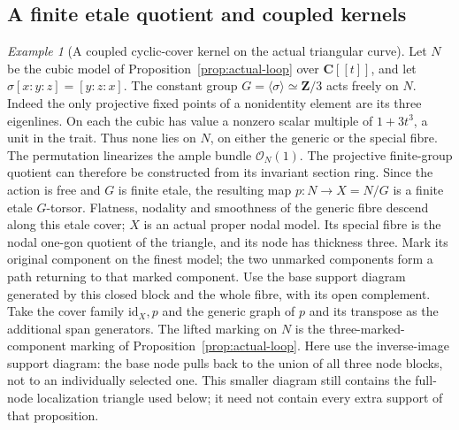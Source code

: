 \documentclass[11pt]{article}
\theoremstyle{definition}
\theoremstyle{remark}
\newtheorem{example}[theorem]{Example}
\begin{document}
\subsection{A finite etale quotient and coupled kernels}
\begin{example}[A coupled cyclic-cover kernel on the actual triangular curve]
\label{ex:etale-cyclic-span}
Let $N$ be the cubic model of Proposition~\ref{prop:actual-loop}
over $\mathbf C[[t]]$, and let $\sigma[x:y:z]=[y:z:x]$.
The constant group $G=\langle\sigma\rangle\simeq\mathbf Z/3$
acts freely on $N$. Indeed the only projective fixed points of a
nonidentity element are its three eigenlines. On each the cubic
has value a nonzero scalar multiple of $1+3t^3$, a unit in the trait.
Thus none lies on $N$, on either the generic or the special fibre.
The permutation linearizes the ample bundle $\mathcal O_N(1)$.
The projective finite-group quotient can therefore be constructed
from its invariant section ring. Since the action is free and $G$
is finite etale, the resulting map $p:N\to X=N/G$ is a finite
etale $G$-torsor. Flatness, nodality and
smoothness of the generic fibre descend along this etale cover;
$X$ is an actual proper nodal model. Its special fibre is the nodal
one-gon quotient of the triangle, and its node has thickness three.
Mark its original component on the finest model; the two unmarked
components form a path returning to that marked component. Use the
base support diagram generated by this closed block and the whole
fibre, with its open complement. Take the cover family
$\mathrm{id}_X,p$ and the generic graph of $p$ and its transpose
as the additional span generators.
The lifted marking on $N$ is the three-marked-component marking
of Proposition~\ref{prop:actual-loop}. Here use the inverse-image
support diagram: the base node pulls back to the union of all three
node blocks, not to an individually selected one. This smaller
diagram still contains the full-node localization triangle used
below; it need not contain every extra support of that proposition.


\end{example}
\end{document}
